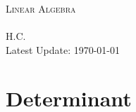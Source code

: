 \documentclass{report}
\theoremstyle{nonumberplain}
\begin{document}
	  

~\\
\begin{center}	
	~\\ 
	\vspace{6em} 
	\textsc{\Huge Linear Algebra}	
	~\\
	\vspace{2.5em} 
	{\Large }
	~\\
	\vspace{6em}
	\textsf{H.C.}
	~\\
	\vspace{5in}  
	{\large Latest Update: \today}
\end{center}
\tableofcontents
\chapter{Determinant}
\end{document}
